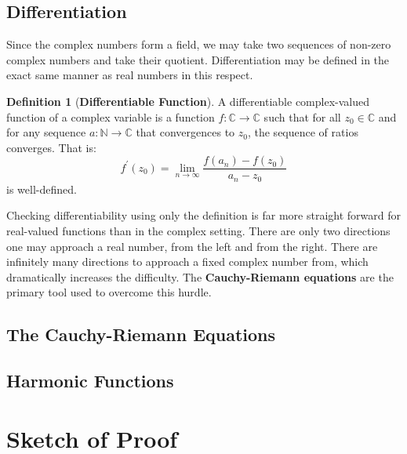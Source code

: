 \documentclass{article}
\theoremstyle{definition}
\newtheorem{definition}{Definition}[section]
\begin{document}
        \subsection{Differentiation}
            Since the complex numbers form a field, we may take two sequences
            of non-zero complex numbers and take their quotient. Differentiation
            may be defined in the exact same manner as real numbers in this
            respect.
            \begin{definition}[\textbf{Differentiable Function}]
                A differentiable complex-valued function of a complex variable
                is a function $f:\mathbb{C}\rightarrow\mathbb{C}$ such that
                for all $z_{0}\in\mathbb{C}$ and for any sequence
                $a:\mathbb{N}\rightarrow\mathbb{C}$ that convergences to
                $z_{0}$, the sequence of ratios converges. That is:
                \begin{equation}
                    f^{\prime}(z_{0})
                    =\lim_{n\rightarrow\infty}
                    \frac{f(a_{n})-f(z_{0})}{a_{n}-z_{0}}
                \end{equation}
                is well-defined.
            \end{definition}
            Checking differentiability using only the definition is far more
            straight forward for real-valued functions than in the complex
            setting. There are only two directions one may approach a real
            number, from the left and from the right. There are infinitely
            many directions to approach a fixed complex number from, which
            dramatically increases the difficulty. The
            \textbf{Cauchy-Riemann equations} are the primary tool used to
            overcome this hurdle.
        \subsection{The Cauchy-Riemann Equations}
        \subsection{Harmonic Functions}
    \section{Sketch of Proof}
\end{document}
